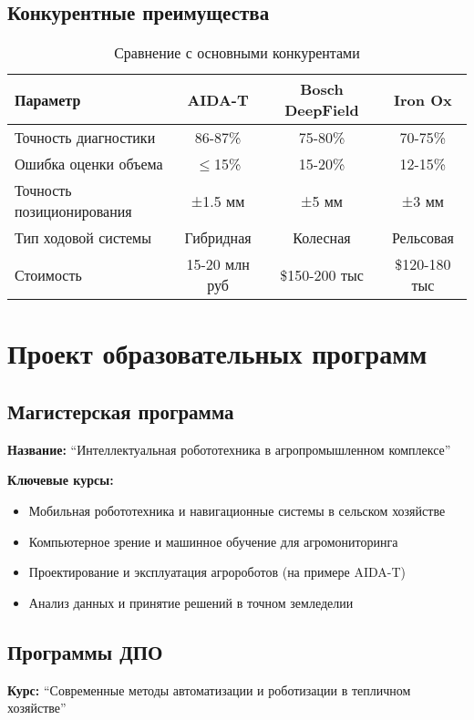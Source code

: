 \documentclass[12pt,a4paper]{article}
\begin{document}
\subsection{Конкурентные преимущества}
\begin{table}[h]
\centering
\begin{tabular}{|l|c|c|c|}
\hline
\textbf{Параметр} & \textbf{AIDA-T} & \textbf{Bosch DeepField} & \textbf{Iron Ox} \\
\hline
Точность диагностики & 86-87\% & 75-80\% & 70-75\% \\
\hline
Ошибка оценки объема & $\leq$15\% & 15-20\% & 12-15\% \\
\hline
Точность позиционирования & ±1.5 мм & ±5 мм & ±3 мм \\
\hline
Тип ходовой системы & Гибридная & Колесная & Рельсовая \\
\hline
Стоимость & 15-20 млн руб & \$150-200 тыс & \$120-180 тыс \\
\hline
\end{tabular}
\caption{Сравнение с основными конкурентами}
\end{table}

\section{Проект образовательных программ}

\subsection{Магистерская программа}
\textbf{Название:} ``Интеллектуальная робототехника в агропромышленном комплексе''

\textbf{Ключевые курсы:}
\begin{itemize}
    \item Мобильная робототехника и навигационные системы в сельском хозяйстве
    \item Компьютерное зрение и машинное обучение для агромониторинга
    \item Проектирование и эксплуатация агророботов (на примере AIDA-T)
    \item Анализ данных и принятие решений в точном земледелии
\end{itemize}

\subsection{Программы ДПО}
\textbf{Курс:} ``Современные методы автоматизации и роботизации в тепличном хозяйстве''
\end{document}

